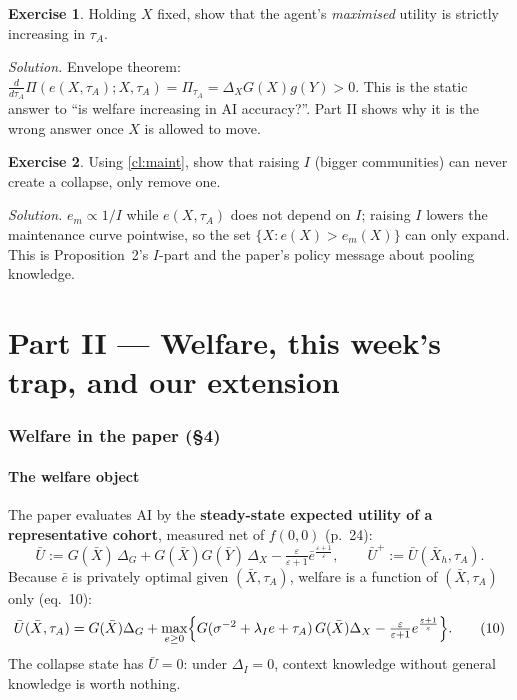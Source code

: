 \documentclass[11pt,a4paper]{article}
\theoremstyle{definition}
\newtheorem{exercise}{Exercise}[section]
\theoremstyle{remark}
\newcommand{\tA}{\tau_A}
\newcommand{\lI}{\lambda_I}
\begin{document}
\begin{exercise}
Holding $X$ fixed, show that the agent's \emph{maximised} utility is strictly increasing in $\tA$.
\end{exercise}
\emph{Solution.} Envelope theorem: $\frac{d}{d\tA}\Pi(e(X,\tA);X,\tA)=\Pi_{\tA}=\Delta_XG(X)g(Y)>0$. This is
the static answer to ``is welfare increasing in AI accuracy?''. Part II shows why it is the wrong answer
once $X$ is allowed to move.

\begin{exercise}
Using \cref{cl:maint}, show that raising $I$ (bigger communities) can never create a collapse, only remove
one.
\end{exercise}
\emph{Solution.} $e_m\propto 1/I$ while $e(X,\tA)$ does not depend on $I$; raising $I$ lowers the maintenance
curve pointwise, so the set $\{X:e(X)>e_m(X)\}$ can only expand. This is Proposition~2's $I$-part and the
paper's policy message about pooling knowledge.

\clearpage
\part*{Part II --- Welfare, this week's trap, and our extension}

\section{Welfare in the paper (\S4)}

\subsection{The welfare object}
The paper evaluates AI by the \textbf{steady-state expected utility of a representative cohort}, measured
net of $f(0,0)$ (p.~24):
\[
\bar U:=G(\bar X)\,\Delta_G+G(\bar X)G(\bar Y)\,\Delta_X-\tfrac{\varepsilon}{\varepsilon+1}\bar e^{\frac{\varepsilon+1}{\varepsilon}},
\qquad \bar U^+:=\bar U(\bar X_h,\tA).
\]
Because $\bar e$ is privately optimal given $(\bar X,\tA)$, welfare is a function of $(\bar X,\tA)$ only
(eq.~10):
\begin{equation}\label{eq:W10}
\bar U(\bar X,\tA)=G(\bar X)\Delta_G+\max_{e\ge0}\Bigl\{G(\sigma^{-2}+\lI e+\tA)\,G(\bar X)\Delta_X-
\tfrac{\varepsilon}{\varepsilon+1}e^{\frac{\varepsilon+1}{\varepsilon}}\Bigr\}. \tag{10}
\end{equation}
The collapse state has $\bar U=0$: under $\Delta_I=0$, context knowledge without general knowledge is worth
nothing.
\end{document}
